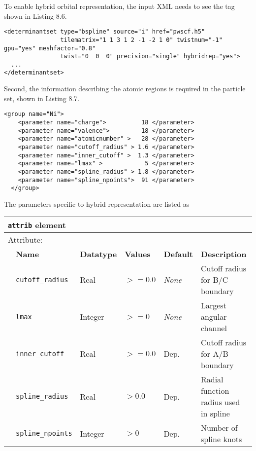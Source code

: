 To enable hybrid orbital representation, the input XML needs to see the tag  shown in Listing 8.6.
\begin{lstlisting}[style=QMCPXML,caption=Hybrid orbital representation input example.\label{listing:hybridrep}]
<determinantset type="bspline" source="i" href="pwscf.h5"
                tilematrix="1 1 3 1 2 -1 -2 1 0" twistnum="-1" gpu="yes" meshfactor="0.8"
                twist="0  0  0" precision="single" hybridrep="yes">
  ...
</determinantset>
\end{lstlisting}
Second, the information describing the atomic regions is required in the particle set, shown in Listing 8.7.
\begin{lstlisting}[style=QMCPXML,caption=particleset elements for ions with information needed by hybrid orbital representation.\label{listing:hybridrep_particleset}]
  <group name="Ni">
    <parameter name="charge">          18 </parameter>
    <parameter name="valence">         18 </parameter>
    <parameter name="atomicnumber" >   28 </parameter>
    <parameter name="cutoff_radius" > 1.6 </parameter>
    <parameter name="inner_cutoff" >  1.3 </parameter>
    <parameter name="lmax" >            5 </parameter>
    <parameter name="spline_radius" > 1.8 </parameter>
    <parameter name="spline_npoints">  91 </parameter>
  </group>
\end{lstlisting}

The parameters specific to hybrid representation are listed as
\begin{table}[h]
\centering
\begin{tabularx}{\textwidth}{l l l l l l }
\hline
\multicolumn{6}{l}{\texttt{attrib} element} \\
\hline
\multicolumn{2}{l}{Attribute:} & \multicolumn{4}{l}{}\\
   &   \bfseries Name            & \bfseries Datatype & \bfseries Values & \bfseries Default   & \bfseries Description \\
   &   \texttt{cutoff\_radius}             &  Real            &  $>=0.0$    &  \textit{None}    & Cutoff radius for B/C boundary  \\
   &   \texttt{lmax}         &  Integer            &  $>=0$ &  \textit{None} & Largest angular channel \\
   &   \texttt{inner\_cutoff}             &  Real            &  $>=0.0$    &  Dep.    & Cutoff radius for A/B boundary  \\
   &   \texttt{spline\_radius}         &  Real            &  $>0.0$ &  Dep. & Radial function radius used in spline \\
   &   \texttt{spline\_npoints}         &  Integer            &  $>0$ &  Dep. & Number of spline knots \\
  \hline
\end{tabularx}
\end{table}

